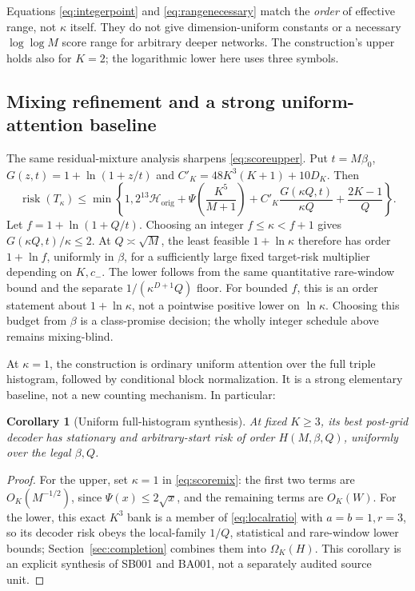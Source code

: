 \documentclass[11pt,letterpaper]{article}
\newtheorem{corollary}[theorem]{Corollary}
\theoremstyle{definition}\newtheorem{definition}[theorem]{Definition}
\theoremstyle{remark}\newtheorem{remark}[theorem]{Remark}
\newcommand{\betaz}{\beta_0}
\newcommand{\unit}[1]{\textsf{#1}}
\begin{document}
Equations \eqref{eq:integerpoint} and \eqref{eq:rangenecessary} match the \emph{order} of effective range, not $\kappa$ itself. They do not give dimension-uniform constants or a necessary $\log\log M$ score range for arbitrary deeper networks. The construction's upper holds also for $K=2$; the logarithmic lower here uses three symbols.

\subsection{Mixing refinement and a strong uniform-attention baseline}
The same residual-mixture analysis sharpens \eqref{eq:scoreupper}. Put $t=M\betaz$, $G(z,t)=1+\ln(1+z/t)$ and $C'_K=48K^3(K+1)+10D_K$. Then
\begin{equation}\label{eq:scoremix}
 \operatorname{risk}(T_\kappa)\le\min\left\{1,
 2^{13}\mathcal H_{\mathrm{orig}}+\Psi\left(\frac{K^5}{M+1}\right)
 +C'_K\frac{G(\kappa Q,t)}{\kappa Q}+\frac{2K-1}{Q}\right\}.
\end{equation}
Let $f=1+\ln(1+Q/t)$. Choosing an integer $f\le\kappa<f+1$ gives $G(\kappa Q,t)/\kappa\le2$. At $Q\asymp\sqrt M$, the least feasible $1+\ln\kappa$ therefore has order $1+\ln f$, uniformly in $\beta$, for a sufficiently large fixed target-risk multiplier depending on $K,c_-$. The lower follows from the same quantitative rare-window bound and the separate $1/(\kappa^{D+1}Q)$ floor. For bounded $f$, this is an order statement about $1+\ln\kappa$, not a pointwise positive lower on $\ln\kappa$. Choosing this budget from $\beta$ is a class-promise decision; the wholly integer schedule above remains mixing-blind.

At $\kappa=1$, the construction is ordinary uniform attention over the full triple histogram, followed by conditional block normalization. It is a strong elementary baseline, not a new counting mechanism. In particular:
\begin{corollary}[Uniform full-histogram synthesis]\label{cor:hist}
At fixed $K\ge3$, its best post-grid decoder has stationary and arbitrary-start risk of order $H(M,\beta,Q)$, uniformly over the legal $\beta,Q$.
\end{corollary}
\begin{proof}
For the upper, set $\kappa=1$ in \eqref{eq:scoremix}: the first two terms are $O_K(M^{-1/2})$, since $\Psi(x)\le2\sqrt x$, and the remaining terms are $O_K(W)$. For the lower, this exact $K^3$ bank is a member of \eqref{eq:localratio} with $a=b=1,r=3$, so its decoder risk obeys the local-family $1/Q$, statistical and rare-window lower bounds; Section~\ref{sec:completion} combines them into $\Omega_K(H)$. This corollary is an explicit synthesis of \unit{SB001} and \unit{BA001}, not a separately audited source unit.
\end{proof}
\end{document}
